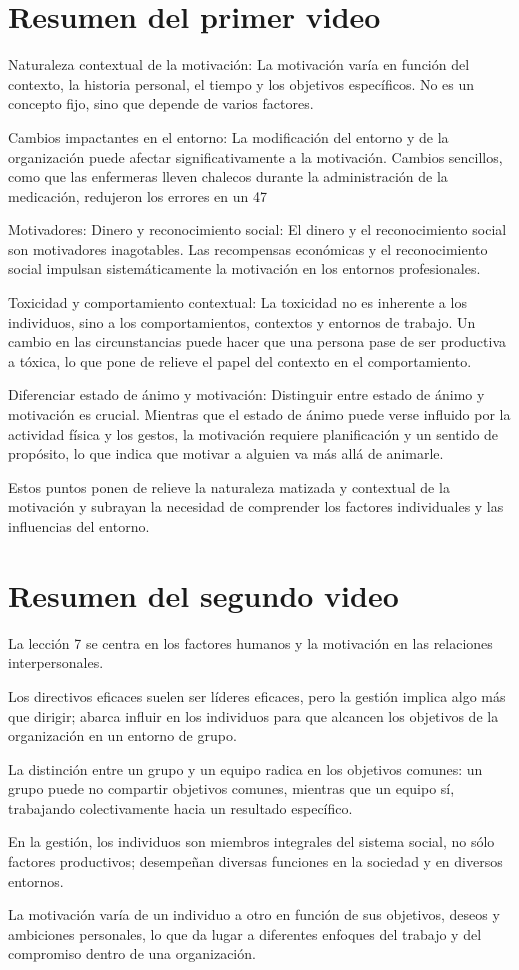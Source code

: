\documentclass[12pt, a4paper]{article}
\begin{document}
    \section{Resumen del primer video}
    Naturaleza contextual de la motivación: La motivación varía en función del contexto, la historia personal, el tiempo y los objetivos específicos. No es un concepto fijo, sino que depende de varios factores.

    Cambios impactantes en el entorno: La modificación del entorno y de la organización puede afectar significativamente a la motivación. Cambios sencillos, como que las enfermeras lleven chalecos durante la administración de la medicación, redujeron los errores en un 47%

    Motivadores: Dinero y reconocimiento social: El dinero y el reconocimiento social son motivadores inagotables. Las recompensas económicas y el reconocimiento social impulsan sistemáticamente la motivación en los entornos profesionales.

    Toxicidad y comportamiento contextual: La toxicidad no es inherente a los individuos, sino a los comportamientos, contextos y entornos de trabajo. Un cambio en las circunstancias puede hacer que una persona pase de ser productiva a tóxica, lo que pone de relieve el papel del contexto en el comportamiento.

    Diferenciar estado de ánimo y motivación: Distinguir entre estado de ánimo y motivación es crucial. Mientras que el estado de ánimo puede verse influido por la actividad física y los gestos, la motivación requiere planificación y un sentido de propósito, lo que indica que motivar a alguien va más allá de animarle.

    Estos puntos ponen de relieve la naturaleza matizada y contextual de la motivación y subrayan la necesidad de comprender los factores individuales y las influencias del entorno.
    
    \section{ Resumen del segundo video}
    La lección 7 se centra en los factores humanos y la motivación en las relaciones interpersonales.

    Los directivos eficaces suelen ser líderes eficaces, pero la gestión implica algo más que dirigir; abarca influir en los individuos para que alcancen los objetivos de la organización en un entorno de grupo.

    La distinción entre un grupo y un equipo radica en los objetivos comunes: un grupo puede no compartir objetivos comunes, mientras que un equipo sí, trabajando colectivamente hacia un resultado específico.

    En la gestión, los individuos son miembros integrales del sistema social, no sólo factores productivos; desempeñan diversas funciones en la sociedad y en diversos entornos.

    La motivación varía de un individuo a otro en función de sus objetivos, deseos y ambiciones personales, lo que da lugar a diferentes enfoques del trabajo y del compromiso dentro de una organización.
\end{document}
